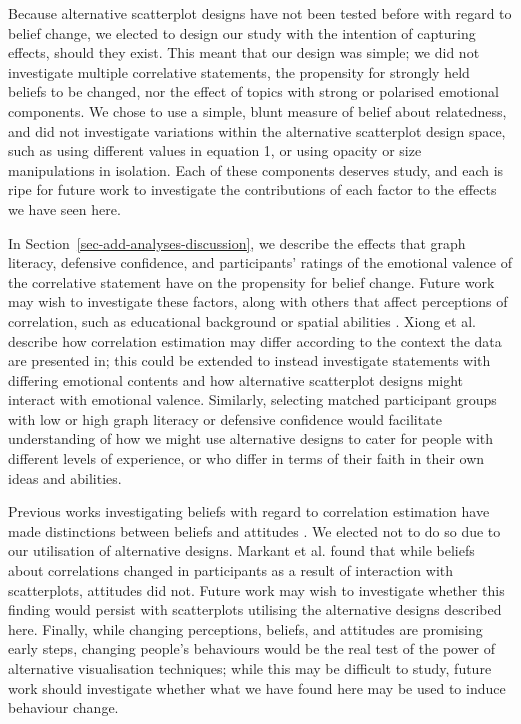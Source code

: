 \documentclass[sigconf]{acmart}
\begin{document}
Because alternative scatterplot designs have not been tested before with
regard to belief change, we elected to design our study with the
intention of capturing effects, should they exist. This meant that our
design was simple; we did not investigate multiple correlative
statements, the propensity for strongly held beliefs to be changed, nor
the effect of topics with strong or polarised emotional components. We
chose to use a simple, blunt measure of belief about relatedness, and
did not investigate variations within the alternative scatterplot design
space, such as using different values in equation 1, or using opacity or
size manipulations in isolation. Each of these components deserves
study, and each is ripe for future work to investigate the contributions
of each factor to the effects we have seen here.

In Section~\ref{sec-add-analyses-discussion}, we describe the effects
that graph literacy, defensive confidence, and participants' ratings of
the emotional valence of the correlative statement have on the
propensity for belief change. Future work may wish to investigate these
factors, along with others that affect perceptions of correlation, such
as educational background or spatial abilities \citep{tandon_2024}.
Xiong et al. \citep{xiong_2022} describe how correlation estimation may
differ according to the context the data are presented in; this could be
extended to instead investigate statements with differing emotional
contents and how alternative scatterplot designs might interact with
emotional valence. Similarly, selecting matched participant groups with
low or high graph literacy or defensive confidence would facilitate
understanding of how we might use alternative designs to cater for
people with different levels of experience, or who differ in terms of
their faith in their own ideas and abilities.

Previous works investigating beliefs with regard to correlation
estimation have made distinctions between beliefs and attitudes
\citep{xiong_2022, markant_2023}. We elected not to do so due to our
utilisation of alternative designs. Markant et al. \citep{markant_2023}
found that while beliefs about correlations changed in participants as a
result of interaction with scatterplots, attitudes did not. Future work
may wish to investigate whether this finding would persist with
scatterplots utilising the alternative designs described here. Finally,
while changing perceptions, beliefs, and attitudes are promising early
steps, changing people's behaviours would be the real test of the power
of alternative visualisation techniques; while this may be difficult to
study, future work should investigate whether what we have found here
may be used to induce behaviour change.
\end{document}
